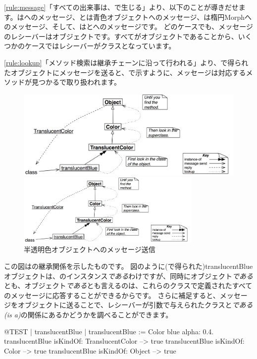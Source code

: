 \documentclass[a4paper,10pt,twoside]{book}
\begin{document}
\ref{rule:message}「すべての出来事は、で生じる」より、以下のことが導きだせます。はへのメッセージ、とは青色オブジェクトへのメッセージ、は楕円Morphへのメッセージ、そして、はとへのメッセージです。
どのケースでも、メッセージのレシーバーはオブジェクトです。すべてがオブジェクトであることから、いくつかのケースではレシーバーがクラスとなっています。

\ref{rule:lookup}「メソッド検索は継承チェーンに沿って行われる」より、で得られたオブジェクトにメッセージを送ると、で示すように、メッセージは対応するメソッドが見つかるで取り扱われます。

\begin{center}
\begin{figure}[!ht]
\ifluluelse
	{\centerline{\includegraphics[width=\textwidth]{TranslucentClassMessage}}}
	{\centerline{\includegraphics[width=0.8\textwidth]{TranslucentClassMessage}}}
\caption{半透明色オブジェクトへのメッセージ送信}
\end{figure}
\end{center}

この図はの継承関係を示したものです。
図のように(で得られた)translucentBlueオブジェクトは、のインスタンス\emph{である}わけですが、同時にオブジェクト\emph{である}とも、オブジェクト\emph{である}とも言えるのは、これらのクラスで定義されたすべてのメッセージに応答することができるからです。
さらに補足すると、メッセージをオブジェクトに送ることで、レシーバーが引数で与えられたクラスと\emph{である(is a)}の関係にあるかどうかを調べることができます。
\begin{code}{@TEST | translucentBlue |}
translucentBlue := Color blue alpha: 0.4.
translucentBlue isKindOf: TranslucentColor --> true
translucentBlue isKindOf: Color                    --> true
translucentBlue isKindOf: Object                  --> true
\end{code}
\end{document}
